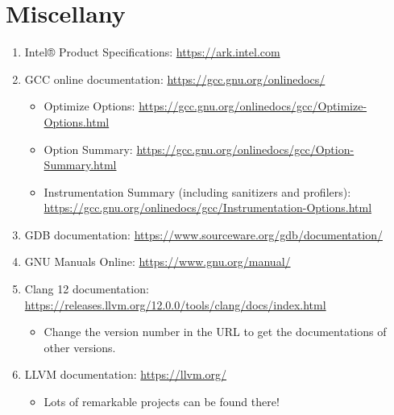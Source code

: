 \documentclass{article}
\begin{document}
\section{Miscellany}
\begin{enumerate}
    \item Intel® Product Specifications:
    \href{https://ark.intel.com}{https://ark.intel.com}
    \item GCC online documentation:
    \href{https://gcc.gnu.org/onlinedocs/}{https://gcc.gnu.org/onlinedocs/}
    \begin{itemize}
        \item Optimize Options:
        \href{https://gcc.gnu.org/onlinedocs/gcc/Optimize-Options.html}{https://gcc.gnu.org/onlinedocs/gcc/Optimize-Options.html}
        \item Option Summary:
        \href{https://gcc.gnu.org/onlinedocs/gcc/Option-Summary.html}{https://gcc.gnu.org/onlinedocs/gcc/Option-Summary.html}
        \item Instrumentation Summary (including sanitizers and profilers):\\
        \href{https://gcc.gnu.org/onlinedocs/gcc/Instrumentation-Options.html}{https://gcc.gnu.org/onlinedocs/gcc/Instrumentation-Options.html}
    \end{itemize}
    \item GDB documentation:
    \href{https://www.sourceware.org/gdb/documentation/}{https://www.sourceware.org/gdb/documentation/}
    \item GNU Manuals Online:
    \href{https://www.gnu.org/manual/}{https://www.gnu.org/manual/}
    \item Clang 12 documentation:
    \href{https://releases.llvm.org/12.0.0/tools/clang/docs/index.html}{https://releases.llvm.org/12.0.0/tools/clang/docs/index.html}
    \begin{itemize}
        \item Change the version number in the URL to get the documentations of other versions.
    \end{itemize}
    \item LLVM documentation:
    \href{https://llvm.org/}{https://llvm.org/}
    \begin{itemize}
        \item Lots of remarkable projects can be found there!
    \end{itemize}
\end{enumerate}



\end{document}
